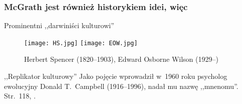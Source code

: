 \documentclass[10pt,t]{beamer}
\begin{document}
\begin{frame}
  \frametitle{McGrath jest również historykiem idei, więc}

  \begin{block}{Prominentni ,,darwiniści kulturowi''}
    \begin{center}
      \begin{figure}
        \texttt{[image: HS.jpg]} \texttt{[image: EOW.jpg]}
        \caption{Herbert Spencer (1820--1903), Edward Osborne Wilson
          (1929--)}
      \end{figure}
    \end{center}
  \end{block}

  \begin{block}{,,Replikator kulturowy''}
    Jako pojęcie wprowadził w~1960 roku psycholog ewolucyjny Donald
    T.~Campbell (1916--1996), nadał mu nazwę ,,mnenomu''. %
    {Str.~118, \cite{AMG08}}.
  \end{block}

\end{frame}





\end{document}
